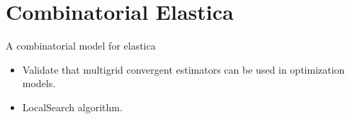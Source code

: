 \section{Combinatorial Elastica}

\begin{frame}
\center
\huge
A combinatorial model for elastica

\vspace{2em}

\begin{minipage}{0.7\textwidth}
\normalsize
\begin{itemize}
\item{Validate that multigrid convergent estimators can be used in optimization models.}
\item{LocalSearch algorithm.}
\end{itemize}
\end{minipage}


\end{frame}

